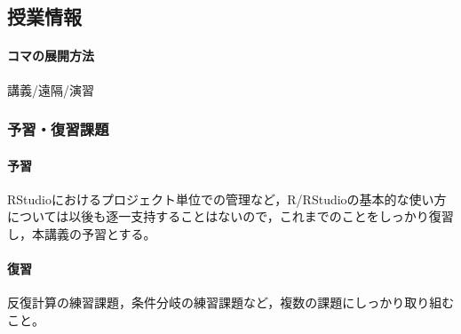 \subsection{授業情報}
\paragraph{コマの展開方法}
講義/遠隔/演習
\subsubsection{予習・復習課題}
\paragraph{予習}RStudioにおけるプロジェクト単位での管理など，R/RStudioの基本的な使い方については以後も逐一支持することはないので，これまでのことをしっかり復習し，本講義の予習とする。
\paragraph{復習}反復計算の練習課題，条件分岐の練習課題など，複数の課題にしっかり取り組むこと。